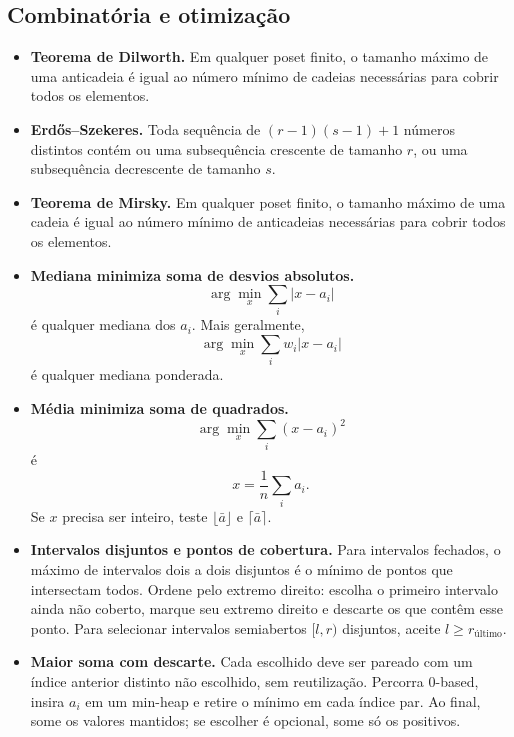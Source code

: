 \subsection{Combinatória e otimização}
\begin{itemize}[leftmargin=*,label={}]
	\item \textbf{Teorema de Dilworth.}
		Em qualquer poset finito, o tamanho máximo de uma anticadeia é igual ao número mínimo de cadeias necessárias para cobrir todos os elementos.

	\item \textbf{Erdős--Szekeres.}
		Toda sequência de $(r-1)(s-1)+1$ números distintos contém ou uma subsequência crescente de tamanho $r$, ou uma subsequência decrescente de tamanho $s$.

	\item \textbf{Teorema de Mirsky.}
		Em qualquer poset finito, o tamanho máximo de uma cadeia é igual ao número mínimo de anticadeias necessárias para cobrir todos os elementos.

		\ifextended
	\item \textbf{Mediana minimiza soma de desvios absolutos.}
		\[
			\arg\min_x \sum_i |x-a_i|
		\]
		é qualquer mediana dos $a_i$. Mais geralmente,
		\[
			\arg\min_x \sum_i w_i |x-a_i|
		\]
		é qualquer mediana ponderada.
		\fi

		\ifextended
	\item \textbf{Média minimiza soma de quadrados.}
		\[
			\arg\min_x \sum_i (x-a_i)^2
		\]
		é
		\[
			x=\frac{1}{n}\sum_i a_i.
		\]
		Se $x$ precisa ser inteiro, teste $\lfloor \bar a \rfloor$ e $\lceil \bar a \rceil$.
		\fi

\item \textbf{Intervalos disjuntos e pontos de cobertura.}
Para intervalos fechados, o máximo de intervalos dois a dois disjuntos é o mínimo de pontos que intersectam todos. Ordene pelo extremo direito: escolha o primeiro intervalo ainda não coberto, marque seu extremo direito e descarte os que contêm esse ponto. Para selecionar intervalos semiabertos $[l,r)$ disjuntos, aceite $l\ge r_{\text{último}}$.

	\item \textbf{Maior soma com descarte.}
		Cada escolhido deve ser pareado com um índice anterior distinto não escolhido, sem reutilização. Percorra 0-based, insira $a_i$ em um min-heap e retire o mínimo em cada índice par. Ao final, some os valores mantidos; se escolher é opcional, some só os positivos.

\end{itemize}


